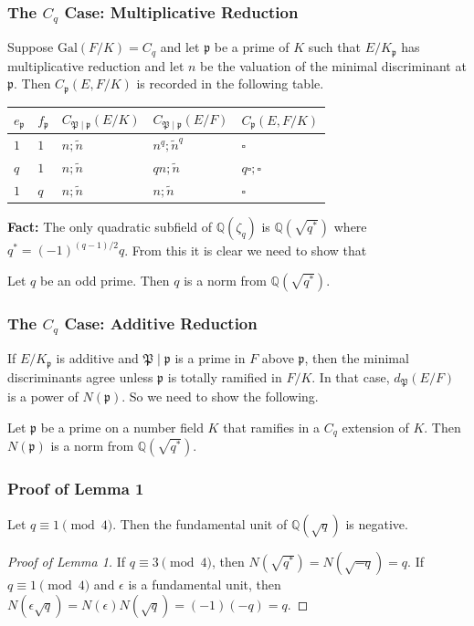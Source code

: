 \documentclass{beamer}
\newcommand{\Gal}{\mathrm{Gal}}
\newcommand{\PP}{\mathfrak{P}}
\newcommand{\QQ}{\mathbb{Q}}
\newcommand{\pp}{\mathfrak{p}}
\theoremstyle{plain}
\begin{document}
\begin{frame}
    \frametitle{The $C_q$ Case: Multiplicative Reduction}
    Suppose $\Gal(F/K)=C_q$ and let $\pp$ be a prime of $K$ such that $E/K_\pp$ has multiplicative reduction and let $n$ be the valuation of the minimal discriminant at $\pp$. \pause Then $C_\pp(E,F/K)$ is recorded in the following table.

    \begin{table}[!ht]
        \centering
        \begin{tabular}{|l|l|l|l|l|}
        \hline
        $e_\pp$ & $f_\pp$  & $C_{\PP\mid\pp}(E/K)$ & $C_{\PP\mid\pp}(E/F)$  & $C_\pp(E,F/K)$ \\ \hline
        $1$ & $1$ & $n;\tilde{n}$ & $n^q;\tilde{n}^q$ & $\square$ \\ \hline
        $q$ & $1$ & $n;\tilde{n}$ & $qn;\tilde{n}$ & $q\square;\square$ \\ \hline
        $1$ & $q$ & $n;\tilde{n}$ & $n;\tilde{n}$ & $\square$ \\ \hline
        \end{tabular}
    \end{table}\pause
    \textbf{Fact:} The only quadratic subfield of $\QQ(\zeta_q)$ is $\QQ(\sqrt{q^*})$ where $q^*=(-1)^{(q-1)/2}q$. \pause From this it is clear we need to show that 

    \begin{lemma}[1]
        Let $q$ be an odd prime. Then $q$ is a norm from $\QQ(\sqrt{q^*})$.
    \end{lemma}
    
    
\end{frame}
    

\begin{frame}
    \frametitle{The $C_q$ Case: Additive Reduction}
    If $E/K_\pp$ is additive and $\PP\mid\pp$ is a prime in $F$ above $\pp$, then the minimal discriminants agree unless $\pp$ is totally ramified in $F/K$. \pause In that case, $d_\PP(E/F)$ is a power of $N(\pp)$. So we need to show the following.
    \begin{lemma}[2]
        Let $\pp$ be a prime on a number field $K$ that ramifies in a $C_q$ extension of $K$. Then $N(\pp)$ is a norm from $\QQ(\sqrt{q^*})$.
    \end{lemma}
    

\end{frame}

\iffalse
\begin{frame}
    \frametitle{Proof of Lemma 1}
    \begin{lemma}
        Let $q\equiv1\pmod{4}$. Then the fundamental unit of $\QQ(\sqrt{q})$ is negative.
    \end{lemma} \pause
    \begin{proof}[Proof of Lemma 1]
        If $q\equiv 3\pmod{4}$, then $N(\sqrt{q^*})=N(\sqrt{-q})=q$. \pause If $q\equiv 1\pmod{4}$ and $\epsilon$ is a fundamental unit, then $N(\epsilon\sqrt{q})=N(\epsilon)N(\sqrt{q})=(-1)(-q)=q$. 
    \end{proof}
\end{frame}
\end{document}
